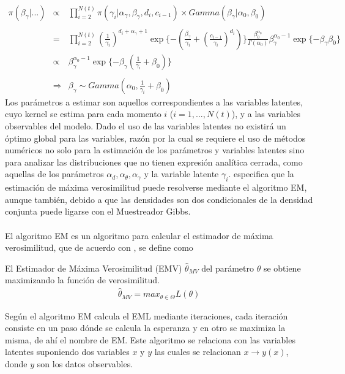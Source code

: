 \\
\begin{eqnarray*}
\pi(\beta_\gamma|...)&\propto&\prod_{i=2}^{N(t)} \pi(\gamma_i|\alpha_\gamma,\beta_\gamma,d_i,c_{i-1})\times Gamma(\beta_\gamma|\alpha_0,\beta_0)\\
\\
&=&\prod_{i=2}^{N(t)}(\frac{1}{\gamma_i})^{d_i+\alpha_\gamma+1}\exp{\{-(\frac{\beta_\gamma}{\gamma_i}+(\frac{c_{i-1}}{\gamma_i})^{d_i})\}}\frac{\beta_0^{\alpha_0}}{\Gamma(\alpha_0)} \beta_\gamma^{\alpha_0-1}\exp{\{-\beta_\gamma\beta_0\}}\\
&\propto&\beta_\gamma^{\alpha_0-1}\exp{\{-\beta_\gamma(\frac{1}{\gamma_i}+\beta_0)\}}\\
\\
&\Rightarrow& \beta_\gamma \sim Gamma(\alpha_0,\frac{1}{\gamma_i}+\beta_0)
\end{eqnarray*}
Los par\'ametros a estimar son aquellos correspondientes a las variables latentes, cuyo kernel se estima para cada momento $i$ ($i=1,...,N(t)$), y a las variables observables del modelo. Dado el uso de las variables latentes no existir\'a un \'optimo global para las variables, raz\'on por la cual se requiere el uso de m\'etodos num\'ericos no solo para la estimaci\'on de los par\'ametros y variables latentes sino para analizar las distribuciones que no tienen expresi\'on anal\'itica cerrada, como aquellas de los par\'ametros $\alpha_d,\alpha_\theta,\alpha_\gamma$ y la variable latente $\gamma_i$. \cite{pitt2002constructing} especifica que la estimaci\'on de m\'axima verosimilitud puede resolverse mediante el algoritmo EM, aunque tambi\'en, debido a que las densidades son dos condicionales de la densidad conjunta puede ligarse con el Muestreador Gibbs.\\
\\
El algoritmo EM es un algoritmo para calcular el estimador de m\'axima verosimilitud, que de acuerdo con \cite{held2014applied}, se define como
\begin{defi}
El Estimador de M\'axima Verosimilitud (EMV) $\hat{\theta}_{MV}$ del par\'ametro $\theta$ se obtiene maximizando la funci\'on de verosimilitud.
\begin{align*}
\hat{\theta}_{MV}=max_{\theta \in \Theta} L(\theta)
\end{align*} 
\end{defi}
Seg\'un \cite{dempster1977maximum} el algoritmo EM calcula el EML mediante iteraciones, cada iteraci\'on consiste en un paso d\'onde se calcula la esperanza y en otro  se maximiza la misma, de ah\'i el nombre de EM. Este algoritmo se relaciona con las variables latentes suponiendo dos variables $x$ y $y$ las cuales se relacionan $x \to y(x)$, donde $y$ son los datos observables.\\
